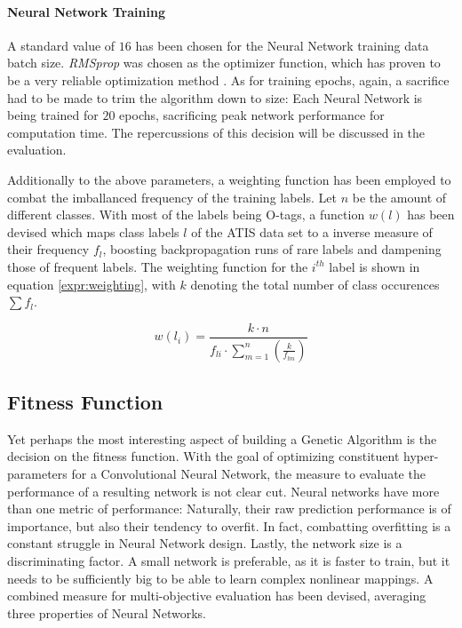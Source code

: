 \documentclass[11pt,a4paper,twoside,openright]{scrbook}
\begin{document}
\paragraph{Neural Network Training} A standard value of \(16\) has been chosen for the Neural Network training data batch size. \emph{RMSprop} was chosen as the optimizer function, which has proven to be a very reliable optimization method \cite{Ruder16}. As for training epochs, again, a sacrifice had to be made to trim the algorithm down to size: Each Neural Network is being trained for \(20\) epochs, sacrificing peak network performance for computation time. The repercussions of this decision will be discussed in the evaluation.

Additionally to the above parameters, a weighting function has been employed to combat the imballanced frequency of the training labels. Let \(n\) be the amount of different classes. With most of the labels being O-tags, a function \(w(l)\) has been devised which maps class labels \(l\) of the ATIS data set to a inverse measure of their frequency \(f_{l}\), boosting backpropagation runs of rare labels and dampening those of frequent labels. The weighting function for the \(i^{th}\) label is shown in equation \ref{expr:weighting}, with \(k\) denoting the total number of class occurences \(\sum f_l\).

\begin{equation}
  w(l_i) = \frac{k \cdot n}{f_{li} \cdot \sum\limits_{m = 1}^{n} (\frac{k}{f_{lm}})}
  \label{expr:weighting}
\end{equation}

\subsection{Fitness Function}
Yet perhaps the most interesting aspect of building a Genetic Algorithm is the decision on the fitness function.
With the goal of optimizing constituent hyper-parameters for a Convolutional Neural Network, the measure to evaluate the performance of a resulting network is not clear cut. Neural networks have more than one metric of performance: Naturally, their raw prediction performance is of importance, but also their tendency to overfit. In fact, combatting overfitting is a constant struggle in Neural Network design. Lastly, the network size is a discriminating factor. A small network is preferable, as it is faster to train, but it needs to be sufficiently big to be able to learn complex nonlinear mappings.
A combined measure for multi-objective evaluation has been devised, averaging three properties of Neural Networks.
\end{document}
